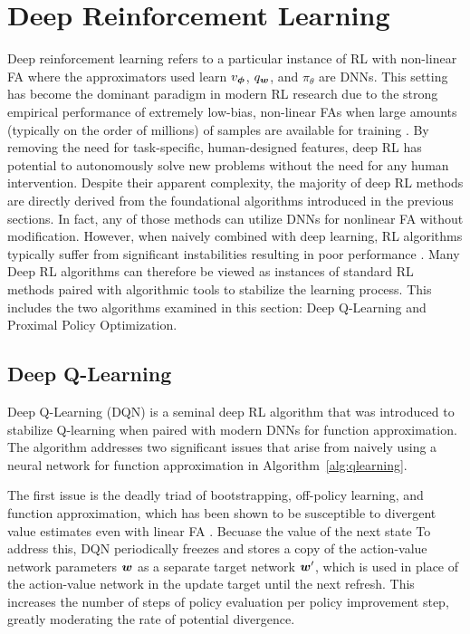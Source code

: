   \section{Deep Reinforcement Learning}
  Deep reinforcement learning refers to a particular instance of RL with non-linear FA where the approximators used learn $v_{\bm \phi}$, $q_{\bm w}$, and $\pi_\theta$ are DNNs. This setting has become the dominant paradigm in modern RL research due to the strong empirical performance of extremely low-bias, non-linear FAs when large amounts (typically on the order of millions) of samples are available for training . By removing the need for task-specific, human-designed features, deep RL has potential to autonomously solve new problems without the need for any human intervention. Despite their apparent complexity, the majority of deep RL methods are directly derived from the foundational algorithms introduced in the previous sections. In fact, any of those methods can utilize DNNs for nonlinear FA without modification. However, when naively combined with deep learning, RL algorithms typically suffer from significant instabilities resulting in poor performance . Many Deep RL algorithms can therefore be viewed as instances of standard RL methods paired with algorithmic tools to stabilize the learning process. This includes the two algorithms examined in this section: Deep Q-Learning and Proximal Policy Optimization.
   
  
  \subsection{Deep Q-Learning} \label{subsec:dqn}
  Deep Q-Learning (DQN)  is a seminal deep RL algorithm that was introduced to stabilize Q-learning when paired with modern DNNs for function approximation. The algorithm addresses two significant issues that arise from naively using a neural network for function approximation in Algorithm~\ref{alg:qlearning}. 
  
  The first issue is the deadly triad \cite{sutton1998introduction} of bootstrapping, off-policy learning, and function approximation, which has been shown to be susceptible to divergent value estimates even with linear FA . Becuase the value of the next state 
  To address this, DQN periodically freezes and stores a copy of the action-value network parameters ${\bm w}$ as a separate target network ${\bm w}'$, which is used in place of the action-value network in the update target until the next refresh. This increases the number of steps of policy evaluation per policy improvement step, greatly moderating the rate of potential divergence. 
  
